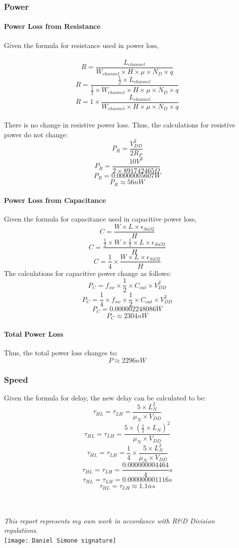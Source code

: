 \documentclass[12pt]{article}
\begin{document}
\subsubsection{Power}
\paragraph{Power Loss from Resistance} 
Given the formula for resistance used in power loss,
\\
\\\[R = \frac{L_{channel}}{W_{channel} \times H \times \mu \times N_D \times q} \]
\[R = \frac{\frac{1}{2} \times L_{channel}}{\frac{1}{2} \times W_{channel} \times H \times \mu \times N_D \times q} \]
\[R = 1 \times \frac{L_{channel}}{W_{channel} \times H \times \mu \times N_D \times q} \]
\\There is no change in resistive power loss. Thus, the calculations for resistive power do not change:
\[P_R = \frac{V_{DD}^2}{2R_P} \]
\[P_R = \frac{10V^2}{2 \times 891742465 \Omega} \]
\[P_R = 0.00000005607W \]
\[P_R \approx 56nW \]
\paragraph{Power Loss from Capacitance}
Given the formula for capacitance used in capacitive power loss,
\[C = \frac{W \times L \times \epsilon _{SiO2}}{H} \]
\[C = \frac{\frac{1}{2} \times W \times \frac{1}{2} \times L \times \epsilon _{SiO2}}{H} \]
\[C = \frac{1}{4} \times \frac{W \times L \times \epsilon _{SiO2}}{H} \]
The calculations for capacitive power change as follows:
\[P_C = f_{sw} \times \frac{1}{2} \times C_{out} \times V_{DD}^2 \]
\[P_C = \frac{1}{4} \times f_{sw} \times \frac{1}{2} \times C_{out} \times V_{DD}^2 \]
\[P_C = 0.000002248086W \]
\[P_C \approx 2304nW \]

\paragraph{Total Power Loss}
Thus, the total power loss changes to:
\[P \approx 2296nW \]

\subsubsection{Speed}
Given the formula for delay, the new delay can be calculated to be:
\[\tau _{HL} = \tau _{LH} = \frac{5 \times L_N^2}{\mu _N \times V_{DD}} \]
\[\tau _{HL} = \tau _{LH} = \frac{5 \times (\frac{1}{2} \times L_N)^2}{\mu _N \times V_{DD}} \]
\[\tau _{HL} = \tau _{LH} = \frac{1}{4} \times \frac{5 \times L_N^2}{\mu _N \times V_{DD}} \]
\[\tau _{HL} = \tau _{LH} = \frac{0.000000004464}{4}s\]
\[\tau _{HL} = \tau _{LH} = 0.000000001116s\]
\[\tau _{HL} = \tau _{LH} \approx 1.1ns\]


\\
\emph {\\This report represents my own work in accordance with R\&D Division regulations.}
\\
\texttt{[image: Daniel Simone signature]}
\end{document}

